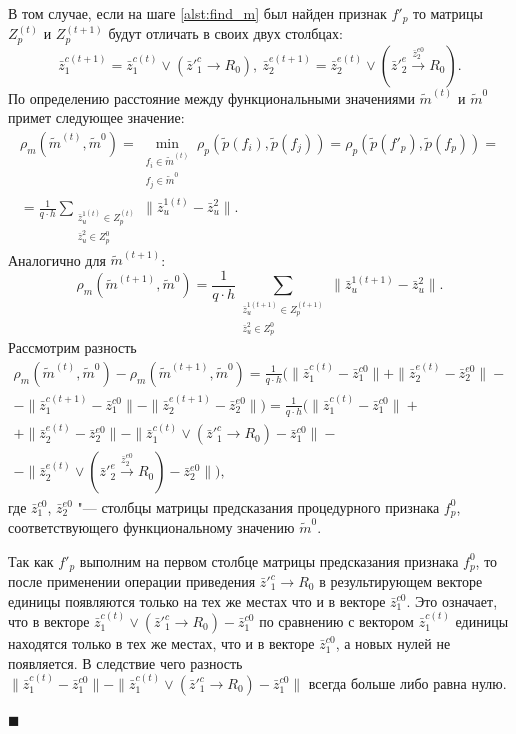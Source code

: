 \documentclass[a4paper, 12pt]{article}
\theoremstyle{plain}
\newenvironment{Proof}%
	{\par\noindent{\bf Доказательство.}}%
	{\hfill$\scriptstyle\blacksquare$}
\begin{document}
\begin{Proof}
		В том случае, если на шаге \ref{alst:find_m} был найден признак $f'_p$ то матрицы $Z_p^{(t)}$ и $Z_p^{(t+1)}$ будут отличать в своих двух столбцах:
		\begin{equation}
		\bar z_1^{c(t+1)}=\bar z_1^{c(t)}\vee (\bar z'^c_1\rightarrow R_0),\ \bar z_2^{e(t+1)}=\bar z_2^{e(t)}\vee (\bar z'^e_2\xrightarrow{\bar z_2^{e0}} R_0).
		\end{equation}
		По определению расстояние между функциональными значениями $\tilde m^{(t)}$ и $\tilde m^0$ примет следующее значение:
		\begin{eqnarray}
		\rho_m(\tilde m^{(t)},\tilde m^0)=\min\limits_{\substack{f_i\in\tilde m^{(t)}\\f_j\in\tilde m^0}}\rho_p(\tilde p(f_i),\tilde p(f_j ))=\rho_p(\tilde p(f'_p),\tilde p(f_p))=\nonumber \\
		=\frac{1}{q\cdot h}\sum\limits_{\substack{\bar z_u^{1(t)}\in Z_p^{(t)}\\\bar z_u^2\in Z_p^0}}\|\bar z_u^{1(t)}-\bar z_u^2\|.
		\end{eqnarray}
		Аналогично для $\tilde m^{(t+1)}$:
		\begin{equation}
		\rho_m(\tilde m^{(t+1)},\tilde m^0)=\frac{1}{q\cdot h}\sum_{\substack{\bar z_u^{1(t+1)}\in Z_p^{(t+1)}\\\bar z_u^2\in Z_p^0}}\|\bar z_u^{1(t+1)}-\bar z_u^2\|.
		\end{equation}
		Рассмотрим разность 
		\begin{eqnarray}
		\rho_m(\tilde m^{(t)},\tilde m^0)-\rho_m(\tilde m^{(t+1)},\tilde m^0)=\frac{1}{q\cdot h}(\|\bar z_1^{c(t)}-\bar z_1^{c0}\|+\|\bar z_2^{e(t)}-\bar z_2^{e0}\|-\nonumber \\
		-\|\bar z_1^{c(t+1)}-\bar z_1^{c0}\|-\|\bar z_2^{e(t+1)}-\bar z_2^{e0}\|)=\frac{1}{q\cdot h}(\|\bar z_1^{c(t)}-\bar z_1^{c0}\|+\nonumber \\
		+\|\bar z_2^{e(t)}-\bar z_2^{e0}\|-\|\bar z_1^{c(t)}\vee (\bar z'^c_1\rightarrow R_0)-\bar z_1^{c0}\|-\nonumber \\
		-\|\bar z_2^{e(t)}\vee (\bar z'^e_2\xrightarrow{\bar z_2^{e0}} R_0)-\bar z_2^{e0}\|),
		\end{eqnarray}
		где $\bar z_1^{c0}$, $\bar z_2^{e0}$ "--- столбцы матрицы предсказания процедурного признака $f_p^0$, соответствующего функциональному значению $\tilde m^0$.
		
		Так как $f'_p$ выполним на первом столбце матрицы предсказания признака $f_p^0$, то после применении операции приведения $\bar z'^c_1\rightarrow R_0$ в результирующем векторе единицы появляются только на тех же местах что и в векторе $\bar z_1^{c0}$. Это означает, что в векторе $\bar z_1^{c(t)}\vee (\bar z'^c_1\rightarrow R_0)-\bar z_1^{c0}$ по сравнению с вектором $\bar z_1^{c(t)}$  единицы находятся только в тех же местах, что и в векторе $\bar z_1^{c0}$, а новых нулей не появляется. В следствие чего разность $\|\bar z_1^{c(t)}-\bar z_1^{c0}\|-\|\bar z_1^{c(t)}\vee (\bar z'^c_1\rightarrow R_0)-\bar z_1^{c0}\|$ всегда больше либо равна нулю.
		

\end{Proof}
\end{document}

